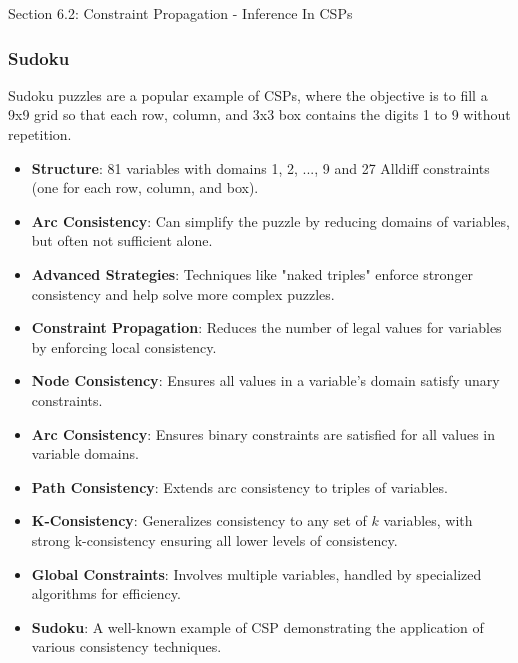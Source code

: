 \begin{notes}{Section 6.2: Constraint Propagation - Inference In CSPs}
\begin{highlight}
    \end{highlight}
    
    \subsubsection*{Sudoku}
    
    Sudoku puzzles are a popular example of CSPs, where the objective is to fill a 9x9 grid so that each row, column, and 3x3 box contains the digits 1 to 9 without repetition.
    
    \begin{highlight}[Sudoku]
    
        \begin{itemize}
            \item \textbf{Structure}: 81 variables with domains {1, 2, ..., 9} and 27 Alldiff constraints (one for each row, column, and box).
            \item \textbf{Arc Consistency}: Can simplify the puzzle by reducing domains of variables, but often not sufficient alone.
            \item \textbf{Advanced Strategies}: Techniques like "naked triples" enforce stronger consistency and help solve more complex puzzles.
        \end{itemize}
    
    \end{highlight}
    
    \begin{highlight}
    
        \begin{itemize}
            \item \textbf{Constraint Propagation}: Reduces the number of legal values for variables by enforcing local consistency.
            \item \textbf{Node Consistency}: Ensures all values in a variable's domain satisfy unary constraints.
            \item \textbf{Arc Consistency}: Ensures binary constraints are satisfied for all values in variable domains.
            \item \textbf{Path Consistency}: Extends arc consistency to triples of variables.
            \item \textbf{K-Consistency}: Generalizes consistency to any set of $k$ variables, with strong k-consistency ensuring all lower levels of consistency.
            \item \textbf{Global Constraints}: Involves multiple variables, handled by specialized algorithms for efficiency.
            \item \textbf{Sudoku}: A well-known example of CSP demonstrating the application of various consistency techniques.
        \end{itemize}
    

\end{highlight}
\end{notes}
